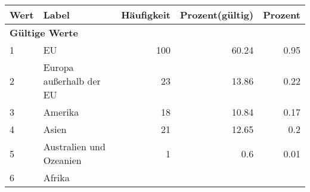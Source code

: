      \begin{longtable}{lXrrr}
     \toprule
     \textbf{Wert} & \textbf{Label} & \textbf{Häufigkeit} & \textbf{Prozent(gültig)} & \textbf{Prozent} \\
     \endhead
     \midrule
     \multicolumn{5}{l}{\textbf{Gültige Werte}}\\

     1 &
     \multicolumn{1}{X}{ EU   } &


       \num{100} &
       \num[round-mode=places,round-precision=2]{60.24} &
         \num[round-mode=places,round-precision=2]{0.95} \\

     2 &
     \multicolumn{1}{X}{ Europa außerhalb der EU   } &


       \num{23} &
       \num[round-mode=places,round-precision=2]{13.86} &
         \num[round-mode=places,round-precision=2]{0.22} \\

     3 &
     \multicolumn{1}{X}{ Amerika   } &


       \num{18} &
       \num[round-mode=places,round-precision=2]{10.84} &
         \num[round-mode=places,round-precision=2]{0.17} \\

     4 &
     \multicolumn{1}{X}{ Asien   } &


       \num{21} &
       \num[round-mode=places,round-precision=2]{12.65} &
         \num[round-mode=places,round-precision=2]{0.2} \\

     5 &
     \multicolumn{1}{X}{ Australien und Ozeanien   } &


       \num{1} &
       \num[round-mode=places,round-precision=2]{0.6} &
         \num[round-mode=places,round-precision=2]{0.01} \\

     6 &
     \multicolumn{1}{X}{ Afrika   } &



\end{longtable}

